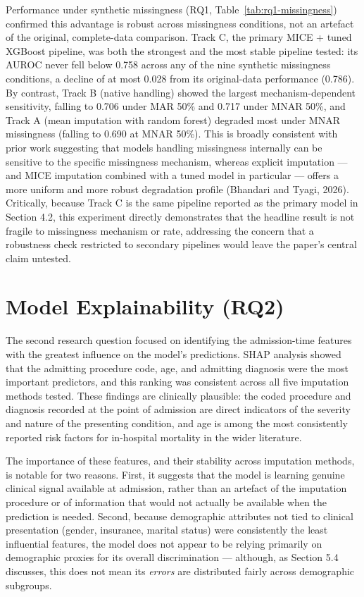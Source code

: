 \documentclass[12pt,a4paper]{report}
\begin{document}
Performance under synthetic missingness (RQ1, Table~\ref{tab:rq1-missingness}) confirmed this advantage is robust across missingness conditions, not an artefact of the original, complete-data comparison. Track C, the primary MICE + tuned XGBoost pipeline, was both the strongest and the most stable pipeline tested: its AUROC never fell below 0.758 across any of the nine synthetic missingness conditions, a decline of at most 0.028 from its original-data performance (0.786). By contrast, Track B (native handling) showed the largest mechanism-dependent sensitivity, falling to 0.706 under MAR 50\% and 0.717 under MNAR 50\%, and Track A (mean imputation with random forest) degraded most under MNAR missingness (falling to 0.690 at MNAR 50\%). This is broadly consistent with prior work suggesting that models handling missingness internally can be sensitive to the specific missingness mechanism, whereas explicit imputation --- and MICE imputation combined with a tuned model in particular --- offers a more uniform and more robust degradation profile (Bhandari and Tyagi, 2026). Critically, because Track C is the same pipeline reported as the primary model in Section 4.2, this experiment directly demonstrates that the headline result is not fragile to missingness mechanism or rate, addressing the concern that a robustness check restricted to secondary pipelines would leave the paper's central claim untested.


\section{Model Explainability (RQ2)}
The second research question focused on identifying the admission-time features with the greatest influence on the model's predictions. SHAP analysis showed that the admitting procedure code, age, and admitting diagnosis were the most important predictors, and this ranking was consistent across all five imputation methods tested. These findings are clinically plausible: the coded procedure and diagnosis recorded at the point of admission are direct indicators of the severity and nature of the presenting condition, and age is among the most consistently reported risk factors for in-hospital mortality in the wider literature.

The importance of these features, and their stability across imputation methods, is notable for two reasons. First, it suggests that the model is learning genuine clinical signal available at admission, rather than an artefact of the imputation procedure or of information that would not actually be available when the prediction is needed. Second, because demographic attributes not tied to clinical presentation (gender, insurance, marital status) were consistently the least influential features, the model does not appear to be relying primarily on demographic proxies for its overall discrimination --- although, as Section 5.4 discusses, this does not mean its \emph{errors} are distributed fairly across demographic subgroups.
\end{document}
